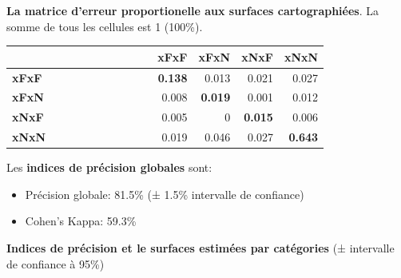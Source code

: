 \documentclass[a4paper, notitlepage, 12pt, krantz2]{krantz}
\begin{document}
\textbf{La matrice d'erreur proportionelle aux surfaces cartographiées}. La somme de tous les cellules est 1 (100\%).

\begin{longtable}[]{@{}llrrrr@{}}
\toprule
& & xFxF & xFxN & xNxF & xNxN\tabularnewline
\midrule
\endhead
\textbf{xFxF} & ~ ~ ~ ~ ~ ~ ~ ~ ~ ~ & \textbf{0.138} & 0.013 & 0.021 & 0.027\tabularnewline
\textbf{xFxN} & & 0.008 & \textbf{0.019} & 0.001 & 0.012\tabularnewline
\textbf{xNxF} & & 0.005 & 0 & \textbf{0.015} & 0.006\tabularnewline
\textbf{xNxN} & & 0.019 & 0.046 & 0.027 & \textbf{0.643}\tabularnewline
\bottomrule
\end{longtable}

Les \textbf{indices de précision globales} sont:

\begin{itemize}
\item
  Précision globale: 81.5\% (± 1.5\% intervalle de confiance)
\item
  Cohen's Kappa: 59.3\%
\end{itemize}

\textbf{Indices de précision et le surfaces estimées par catégories} (± intervalle de confiance à 95\%)
\end{document}
